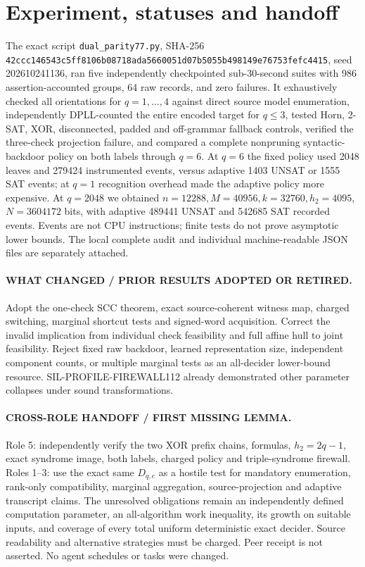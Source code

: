 \documentclass[11pt]{article}
\begin{document}
\section{Experiment, statuses and handoff}
The exact script \texttt{dual\_parity77.py}, SHA-256 \texttt{42ccc146543c5ff8106b08718ada5660051d07b5055b498149e76753fefc4415}, seed 202610241136, ran five independently checkpointed sub-30-second suites with 986 assertion-accounted groups, 64 raw records, and zero failures. It exhaustively checked all orientations for $q=1,\ldots,4$ against direct source model enumeration, independently DPLL-counted the entire encoded target for $q\le3$, tested Horn, 2-SAT, XOR, disconnected, padded and off-grammar fallback controls, verified the three-check projection failure, and compared a complete nonpruning syntactic-backdoor policy on both labels through $q=6$. At $q=6$ the fixed policy used 2048 leaves and 279424 instrumented events, versus adaptive 1403 UNSAT or 1555 SAT events; at $q=1$ recognition overhead made the adaptive policy more expensive. At $q=2048$ we obtained $n=12288,M=40956,k=32760,h_2=4095$, $N=3604172$ bits, with adaptive 489441 UNSAT and 542685 SAT recorded events. Events are not CPU instructions; finite tests do not prove asymptotic lower bounds. The local complete audit and individual machine-readable JSON files are separately attached.

\paragraph{WHAT CHANGED / PRIOR RESULTS ADOPTED OR RETIRED.} Adopt the one-check SCC theorem, exact source-coherent witness map, charged switching, marginal shortcut tests and signed-word acquisition. Correct the invalid implication from individual check feasibility and full affine hull to joint feasibility. Reject fixed raw backdoor, learned representation size, independent component counts, or multiple marginal tests as an all-decider lower-bound resource. SIL-PROFILE-FIREWALL112 already demonstrated other parameter collapses under sound transformations.

\paragraph{CROSS-ROLE HANDOFF / FIRST MISSING LEMMA.} Role 5: independently verify the two XOR prefix chains, formulas, $h_2=2q-1$, exact syndrome image, both labels, charged policy and triple-syndrome firewall. Roles 1--3: use the exact same $D_{q,e}$ as a hostile test for mandatory enumeration, rank-only compatibility, marginal aggregation, source-projection and adaptive transcript claims. The unresolved obligations remain an independently defined computation parameter, an all-algorithm work inequality, its growth on suitable inputs, and coverage of every total uniform deterministic exact decider. Source readability and alternative strategies must be charged. Peer receipt is not asserted. No agent schedules or tasks were changed.
\end{document}
